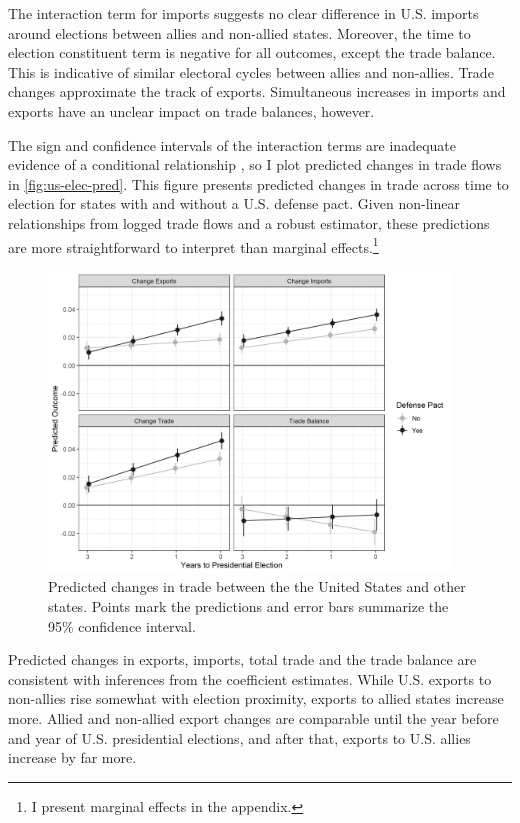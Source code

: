 \documentclass[12pt]{article}
\begin{document}
The interaction term for imports suggests no clear difference in U.S. imports around elections between allies and non-allied states. 
Moreover, the time to election constituent term is negative for all outcomes, except the trade balance. 
This is indicative of similar electoral cycles between allies and non-allies.
Trade changes approximate the track of exports. 
Simultaneous increases in imports and exports have an unclear impact on trade balances, however. 
 


The sign and confidence intervals of the interaction terms are inadequate evidence of a conditional relationship \citep{BramborClarkGolder2006}, so I plot predicted changes in trade flows in \autoref{fig:us-elec-pred}.
This figure presents predicted changes in trade across time to election for states with and without a U.S. defense pact. 
Given non-linear relationships from logged trade flows and a robust estimator, these predictions are more straightforward to interpret than marginal effects.\footnote{I present marginal effects in the appendix.} 


\begin{figure}[htpb]
	\centering
		\includegraphics[width=0.95\textwidth]{../figures/us-elec-pred.png}
	\caption{Predicted changes in trade between the the United States and other states. Points mark the predictions and error bars summarize the 95\% confidence interval.}
	\label{fig:us-elec-pred}
\end{figure}


Predicted changes in exports, imports, total trade and the trade balance are consistent with inferences from the coefficient estimates. 
While U.S. exports to non-allies rise somewhat with election proximity, exports to allied states increase more. 
Allied and non-allied export changes are comparable until the year before and year of U.S. presidential elections, and after that, exports to U.S. allies increase by far more. 
\end{document}
